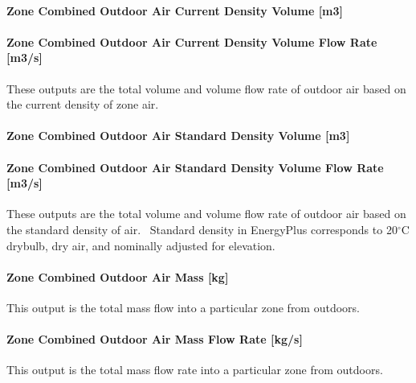 \paragraph{Zone Combined Outdoor Air Current Density Volume {[}m3{]}}\label{zone-combined-outdoor-air-current-density-volume-m3}

\paragraph{Zone Combined Outdoor Air Current Density Volume Flow Rate {[}m3/s{]}}\label{zone-combined-outdoor-air-current-density-volume-flow-rate-m3s}

These outputs are the total volume and volume flow rate of outdoor air based on the current density of zone air.

\paragraph{Zone Combined Outdoor Air Standard Density Volume {[}m3{]}}\label{zone-combined-outdoor-air-standard-density-volume-m3}

\paragraph{Zone Combined Outdoor Air Standard Density Volume Flow Rate {[}m3/s{]}}\label{zone-combined-outdoor-air-standard-density-volume-flow-rate-m3s}

These outputs are the total volume and volume flow rate of outdoor air based on the standard density of air.~ Standard density in EnergyPlus corresponds to 20$^\circ$C drybulb, dry air, and nominally adjusted for elevation.

\paragraph{Zone Combined Outdoor Air Mass {[}kg{]}}\label{zone-combined-outdoor-air-mass-kg}

This output is the total mass flow into a particular zone from outdoors.

\paragraph{Zone Combined Outdoor Air Mass Flow Rate {[}kg/s{]}}\label{zone-combined-outdoor-air-mass-flow-rate-kgs}

This output is the total mass flow rate into a particular zone from outdoors.

